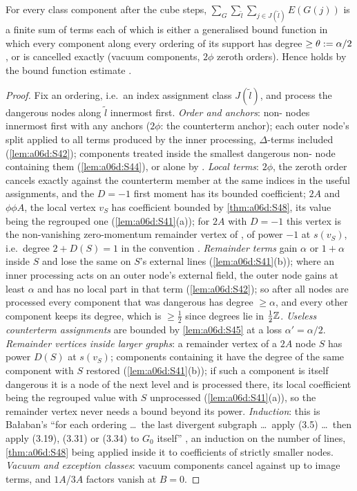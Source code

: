 \begin{theorem}\label{thm:a06d:S49}
For every class component after the cube steps, $\sum_G\sum_{\tilde l}\sum_{j\in J(\tilde l)}E(G(j))$ is a finite sum of terms each of which is either a generalised bound function in which every component along every ordering of its support has degree $\ge\theta:=\alpha/2$, or is cancelled exactly (vacuum components, $2\phi$ zeroth orders). Hence \cite[(3.3)]{Ba3} holds by the bound function estimate \cite[(2.16)]{Ba3}.
\end{theorem}

\begin{proof}
Fix an ordering, i.e.\ an index assignment class $J(\tilde l)$, and process the dangerous nodes along $\tilde l$ innermost first. \emph{Order and anchors}: non-\cite[(2.4)]{Ba3} nodes innermost first with any anchors ($2\phi$: the counterterm anchor); each outer node's split applied to all terms produced by the inner processing, $\Delta$-terms included (\cref{lem:a06d:S42}); \cite[(2.4)]{Ba3} components treated inside the smallest dangerous non-\cite[(2.4)]{Ba3} node containing them (\cref{lem:a06d:S44}), or alone by \cite[(2.8)]{Ba3}. \emph{Local terms}: $2\phi$, the zeroth order cancels exactly against the counterterm member at the same indices in the useful assignments, and the $D=-1$ first moment has its bounded coefficient; $2A$ and $\phi\phi A$, the local vertex $v_S$ has coefficient bounded by \cref{thm:a06d:S48}, its value being the regrouped one (\cref{lem:a06d:S41}(a)); for $2A$ with $D=-1$ this vertex is the non-vanishing zero-momentum remainder vertex of \cite[(3.30)]{Ba3}, of power $-1$ at $s(v_S)$, i.e.\ degree $2+D(S)=1$ in the convention \cite[(2.3)]{Ba3}. \emph{Remainder terms} gain $\alpha$ or $1+\alpha$ inside $S$ and lose the same on $S$'s external lines (\cref{lem:a06d:S41}(b)); where an inner processing acts on an outer node's external field, the outer node gains at least $\alpha$ and has no local part in that term (\cref{lem:a06d:S42}); so after all nodes are processed every component that was dangerous has degree $\ge\alpha$, and every other component keeps its degree, which is $\ge\frac12$ since degrees lie in $\frac12\mathbb Z$. \emph{Useless counterterm assignments} are bounded by \cref{lem:a06d:S45} at a loss $\alpha'=\alpha/2$. \emph{Remainder vertices inside larger graphs}: a remainder vertex of a $2A$ node $S$ has power $D(S)$ at $s(v_S)$; components containing it have the degree of the same component with $S$ restored (\cref{lem:a06d:S41}(b)); if such a component is itself dangerous it is a node of the next level and is processed there, its local coefficient being the regrouped value with $S$ unprocessed (\cref{lem:a06d:S41}(a)), so the remainder vertex never needs a bound beyond its power. \emph{Induction}: this is Ba{\l}aban's ``for each ordering \dots\ the last divergent subgraph \dots\ apply (3.5) \dots\ then apply (3.19), (3.31) or (3.34) to $G_0$ itself'' \cite[pp.~444--445]{Ba3}, an induction on the number of lines, \cref{thm:a06d:S48} being applied inside it to coefficients of strictly smaller nodes. \emph{Vacuum and exception classes}: vacuum components cancel against \cite[(1.24)]{Ba3} up to image terms, and $1A$/$3A$ factors vanish at $B=0$.

\end{proof}
